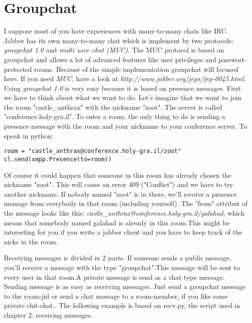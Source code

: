 \section{Groupchat}

I suppose most of you have experiences with many-to-many chats like IRC. Jabber has its own many-to-many chat which is implement by two protocols: \textit{groupchat 1.0} and \textit{multi user chat (MUC)}.
The MUC protocol is based on groupchat and allows a lot of advanced features like user privileges and passwort-protected rooms.
Because of the simple implementation groupchat will focused here.
If you need \textit{MUC}, have a look at \textit{http://www.jabber.org/jeps/jep-0045.html}.
\newline
\newline
Using \textit{groupchat 1.0} is very easy because it is based on presence messages.
First we have to think about what we want to do. Let's imagine that we want to join the room "castle\_anthrax" with the nickname "zoot". The server is called "conference.holy-gra.il".
To enter a room, the only thing to do is sending a presence message with the room and your nickname to your conference server.
\newline
To speak in python:
\begin{verbatim}
room = "castle_anthrax@conference.holy-gra.il/zoot"
cl.send(xmpp.Presence(to=room))
\end{verbatim}
Of course it could happen that someone in this room has already chosen the nickname "zoot". This will cause an error 409 ("Conflict") and we have to try another nickname.
\newline
If nobody named "zoot" is in there, we'll receive a presence message from everybody in that room (including yourself).
The "from" attribut of the message looks like this: \textit{castle\_anthrax@conference.holy-gra.il/galahad}, which means that somebody named galahad is already in this room.This might be interesting for you if you write a jabber client and you have to keep track of the nicks in the room.
\newline

Receiving messages is divided in 2 parts. If someone sends a public message, you'll receive a message with the type "groupchat".This message will be sent to every user in that room.A private message is send as a chat type message.
\newline
Sending message is as easy as receiving messages. Just send a groupchat message to the room-jid or send a chat message to a room-member, if you like some private chit-chat..
\newline
\newline
The following example is based on recv.py, the script used in chapter 2: receiving messages.


